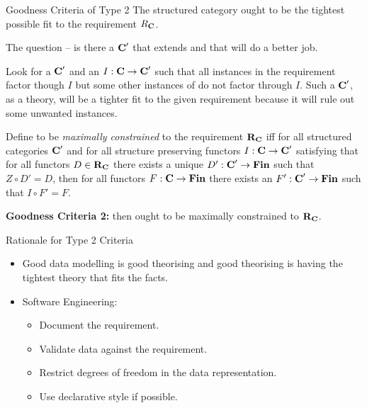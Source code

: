 \documentclass[xcolor=pst,dvips]{beamer}   %
\begin{document}
\begin{frame}{Goodness Criteria of Type 2}
The structured category \catcw ought to be the tightest possible fit to the requirement $R_{\textbf{C}}$.

The question -- is there a $\textbf{C}'$ that extends \catcw and that will do a better job. 

Look for a $\textbf{C}'$ and an $I: \textbf{C} \rightarrow \textbf{C}'$  such that 
all instances in the requirement factor though $I$
but some other instances of \catcw do not factor through $I$. 
Such a $\textbf{C}'$, as a theory, will be a tighter fit to the given requirement 
because it will rule out some unwanted instances.
\end{frame}


\begin{frame}
\begin{definition}
Define \catcw to be \textit{maximally constrained} to the requirement $\textbf{R}_{\textbf{C}}$ iff 
for all structured categories $\textbf{C}'$ 
and for all structure preserving functors $I:\textbf{C} \rightarrow \textbf{C}'$ 
satisfying that for all functors $D \in \textbf{R}_{\textbf{C}}$ 
there exists a  unique $D' : \textbf{C}' \rightarrow \textbf{Fin}$ such that $Z \circ D'=D$,
then for all functors $F: \textbf{C} \rightarrow \textbf{Fin}$  
there exists an $F' : \textbf{C}' \rightarrow \textbf{Fin}$ such that $I \circ F'=F$.
\end{definition}

\textbf {Goodness Criteria 2:} \IfSforCwithRCwordsvariant then \catcw ought to be maximally constrained to $\textbf{R}_{\textbf{C}}$.
\end{frame}

\begin{frame}{Rationale for Type 2 Criteria}
\begin{itemize}
\item Good data modelling is good theorising and good theorising is having the tightest theory that fits the facts.
\item Software Engineering: 
\begin{itemize}
\item Document the requirement.
\item Validate data against the requirement. 
\item Restrict degrees of freedom in the data representation.
\item Use declarative style if possible.
\end{itemize}
\end{itemize}
\end{frame}
\end{document}
